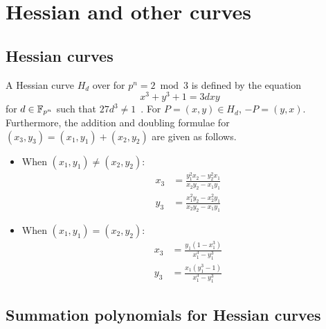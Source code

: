 %
%

\section{Hessian and other curves}
\label{sec:hessian}

\subsection{Hessian curves}
%
A Hessian curve $H_d$ over  for $p^n=2\bmod 3$ is defined by
the equation \begin{equation}
  x^3+y^3+1=3dxy \label{eq:hessian-curve} \end{equation} for
$d\in\mathbb F_{p^n}$ such that $27d^3\neq 1$~\cite{DBLP:conf/ches/Smart01}.
%
For $P=(x,y)\in H_d$, $-P=(y,x)$.
%
Furthermore, the addition and doubling formulae for
$(x_3,y_3)=(x_1,y_1)+(x_2,y_2)$ are given as follows.
%
\begin{itemize}
\item When $(x_1,y_1)\neq(x_2,y_2)$:
  \begin{align*}
    x_3 & = \frac{y_1^2x_2 - y_2^2x_1}{x_2y_2 - x_1y_1} \\
    y_3 & = \frac{x_1^2y_2 - x_2^2y_1}{x_2y_2 - x_1y_1}
  \end{align*}
\item When $(x_1,y_1)=(x_2,y_2)$:
  \begin{align*}
    x_3 & = \frac{y_1(1 - x_1^3)}{x_1^3 - y_1^3} \\
    y_3 & = \frac{x_1(y_1^3 - 1)}{x_1^3 - y_1^3}
  \end{align*}
\end{itemize}

\subsection{Summation polynomials for Hessian curves}

